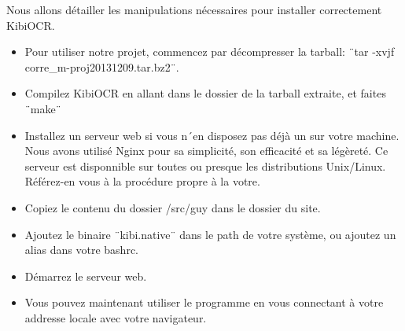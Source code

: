 Nous allons détailler les manipulations nécessaires pour installer correctement KibiOCR.
\begin{itemize}
  \item{Pour utiliser notre projet, commencez par décompresser la tarball: ¨tar -xvjf corre_m-proj20131209.tar.bz2¨.}
  \item{Compilez KibiOCR en allant dans le dossier de la tarball extraite, et faites ¨make¨}
  \item{Installez un serveur web si vous n´en disposez pas déjà un sur votre machine. Nous avons utilisé Nginx pour sa simplicité, son efficacité et sa légèreté. Ce serveur est disponnible sur toutes ou presque les distributions Unix/Linux. Référez-en vous à la procédure propre à la votre.}
  \item{Copiez le contenu du dossier /src/guy dans le dossier du site.}
  \item{Ajoutez le binaire ¨kibi.native¨ dans le path de votre système, ou ajoutez un alias dans votre bashrc.}
  \item{Démarrez le serveur web.}
  \item{Vous pouvez maintenant utiliser le programme en vous connectant à votre addresse locale avec votre navigateur.}
\end{itemize}
